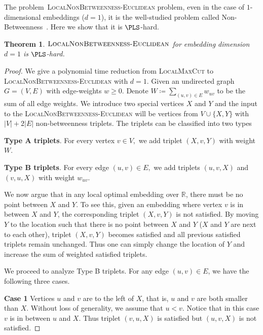 \documentclass{article}
\theoremstyle{definition}  %
\theoremstyle{plain}
\newtheorem{theorem}{Theorem}
\numberwithin{observation}{section}
\numberwithin{claim}{section}
\numberwithin{fact}{section}
\numberwithin{lemma}{section}
\numberwithin{proposition}{section}
\numberwithin{theorem}{section}
\numberwithin{corollary}{section}
\numberwithin{definition}{section}
\newcommand{\nbtw}{\textsc{LocalNonBetweenness-Euclidean}}
\theoremstyle{plain}
\begin{document}
The problem~\textsc{LocalNonBetweenness-Euclidean} problem, even in the case of $1$-dimensional embeddings ($d = 1$), it is the well-studied problem called Non-Betweenness~\citep{guruswami2008beating,charikar2009every,austrin2015np}. Here we show that it is $\PLS$-hard.


\begin{theorem}\label{thm:non-betweenness-pls}
  $\nbtw$ for embedding dimension $d = 1$ is $\PLS$-hard.
\end{theorem}
\begin{proof}


 We give a polynomial time reduction from \textsc{LocalMaxCut} to \textsc{LocalNonBetweenness-Euclidean} with $d = 1$. Given an undirected graph $G = (V, E)$ with edge-weights $w\ge0$. Denote $W\coloneq \sum_{(u,v) \in E} w_{uv}$ to be the sum of all edge weights. We introduce two special vertices $X$ and $Y$ and the input to the \textsc{LocalNonBetweenness-Euclidean} will be vertices from $V \cup \{X, Y\}$ with $|V| + 2|E|$ non-betweenness triplets. The triplets can be classified into two types

\textbf{Type A triplets}. For every vertex $v \in V,$ we add triplet $(X, v, Y)$ with weight $W$.

\textbf{Type B triplets}. For every edge $(u, v) \in E,$ we add triplets $(u, v, X)$ and $(v, u, X)$ with weight $w_{uv}.$

We now argue that in any local optimal embedding over $\mathbb{R}$, there must be no point between $X$ and $Y$. To see this, given an embedding where vertex $v$ is in between $X$ and $Y$, the corresponding triplet $(X, v, Y)$ is not satisfied. By moving $Y$ to the location such that there is no point between $X$ and $Y$ ($X$ and $Y$ are next to each other), triplet $(X, v, Y)$ becomes satisfied and all previous satisfied triplets remain unchanged. Thus one can simply change the location of $Y$ and increase the sum of weighted satisfied triplets.

We proceed to analyze Type B triplets. For any edge $(u, v) \in E$, we have the following three cases.

\textbf{Case 1} Vertices $u$ and $v$ are to the left of $X$, that is, $u$ and $v$ are both smaller than $X$. Without loss of generality, we assume that $u < v$. Notice that in this case $v$ is in between $u$ and $X$. Thus triplet $(v, u, X)$ is satisfied but $(u, v, X)$ is not satisfied.


\end{proof}
\end{document}
